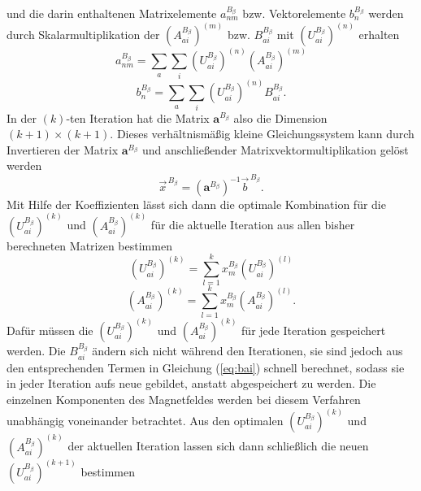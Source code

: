     und die darin enthaltenen Matrixelemente $a_{nm}^{B_\beta}$ bzw. Vektorelemente $b_n^{B_\beta}$ werden durch Skalarmultiplikation der $\left(A_{ai}^{B_\beta}\right)^{(m)}$ bzw. $B_{ai}^{B_\beta}$ mit $\left(U_{ai}^{B_\beta}\right)^{(n)}$ erhalten
    \begin{equation}\label{eq:anm}
    a_{nm}^{B_\beta}=\sum_{a}\sum_i \left(U_{ai}^{B_\beta}\right)^{(n)}\left(A_{ai}^{B_\beta}\right)^{(m)}
    \end{equation}
    \begin{equation}\label{eq:bn}
    b_n^{B_\beta}=\sum_a\sum_i\left(U_{ai}^{B_\beta}\right)^{(n)} B_{ai}^{B_\beta}.
    \end{equation}
    In der $(k)$-ten Iteration hat die Matrix $\boldsymbol{a}^{B_\beta}$ also die Dimension $(k+1)\times(k+1)$. Dieses verhältnismäßig kleine Gleichungssystem kann durch Invertieren der Matrix $\boldsymbol{a}^{B_\beta}$ und anschließender Matrixvektormultiplikation gelöst werden
    \begin{equation}\label{eq:xvec}
    \vec{x}^{\,B_\beta}=\left(\boldsymbol{a}^{B_\beta}\right)^{-1}\vec{b}^{\,B_\beta}.
    \end{equation}
    Mit Hilfe der Koeffizienten lässt sich dann die optimale Kombination für die $\left(U_{ai}^{B_\beta}\right)^{(k)}$ und $\left(A_{ai}^{B_\beta}\right)^{(k)}$ für die aktuelle Iteration aus allen bisher berechneten Matrizen bestimmen
     \begin{equation}\label{eq:uaiopt}
     \left(U_{ai}^{B_\beta}\right)^{(k)}=\sum_{l=1}^k x_m^{B_\beta} \left(U_{ai}^{B_\beta}\right)^{(l)}
     \end{equation}
     \begin{equation}\label{eq:aaiopt}
     \left(A_{ai}^{B_\beta}\right)^{(k)}=\sum_{l=1}^k x_m^{B_\beta} \left(A_{ai}^{B_\beta}\right)^{(l)}.
     \end{equation}
     Dafür müssen die $\left(U_{ai}^{B_\beta}\right)^{(k)}$ und $\left(A_{ai}^{B_\beta}\right)^{(k)}$ für jede Iteration gespeichert werden. Die $B_{ai}^{B_\beta}$ ändern sich nicht während den Iterationen, sie sind jedoch aus den entsprechenden Termen in Gleichung (\ref{eq:bai}) schnell berechnet, sodass sie in jeder Iteration aufs neue gebildet, anstatt abgespeichert zu werden. Die einzelnen Komponenten des Magnetfeldes werden bei diesem Verfahren unabhängig voneinander betrachtet. Aus den optimalen $\left(U_{ai}^{B_\beta}\right)^{(k)}$ und $\left(A_{ai}^{B_\beta}\right)^{(k)}$ der aktuellen Iteration lassen sich dann schließlich die neuen $\left(U_{ai}^{B_\beta}\right)^{(k+1)}$ bestimmen
     
